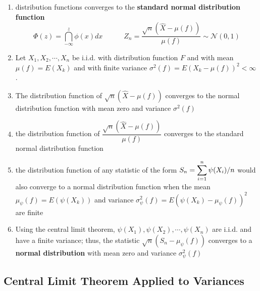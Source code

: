 \begin{enumerate}
    \item distribution functions converges to the \textbf{standard normal distribution function}
    \[
        \Phi(z) = \dint_{-\infty}^{z}
        \phi(x)dx
        \quad\quad\quad
        Z_n = \dfrac{\sqrt{n}(\hat{X} - \mu(f))}{\mu(f)}
        \sim \mathcal{N}(0,1)
    \]

    \item Let $X_1, X_2,\cdots, X_n$ be i.i.d. with distribution function $F$ and with mean $\mu(f) = E(X_k)$ and with finite variance $\sigma ^2(f) = E(X_k - \mu(f))^2 < \infty$. 

    \item The distribution function of $\sqrt{n}(\hat{X}-\mu(f))$ converges to the normal distribution function with mean zero and variance $\sigma ^2(f)$
    
    \item the distribution function of $\dfrac{\sqrt{n}(\hat{X} - \mu(f))}{\mu(f)}$ converges to the standard normal distribution function

    \item the distribution function of any statistic of the form $S_n = \displaystyle\sum_{i=1}^{n} \psi(X_i)/n$ would also converge to a normal distribution function when the mean $\mu _\psi (f) = E(\psi (X_k))$ and variance $\sigma ^2_\psi (f) = E(\psi (X_k) - \mu _\psi (f))^2$ are finite

    \item Using the central limit theorem, $\psi(X_1), \psi(X_2), \cdots, \psi(X_n)$ are i.i.d. and have a finite variance; thus, the statistic $\sqrt{n}(S_n - \mu_\psi(f))$ converges to a \textbf{normal distribution} with mean zero and variance $\sigma^2_\psi(f)$
\end{enumerate}


\subsection{Central Limit Theorem Applied to Variances \cite{ism-1}} \label{sample statistic: Central Limit Theorem Applied to Variances}

